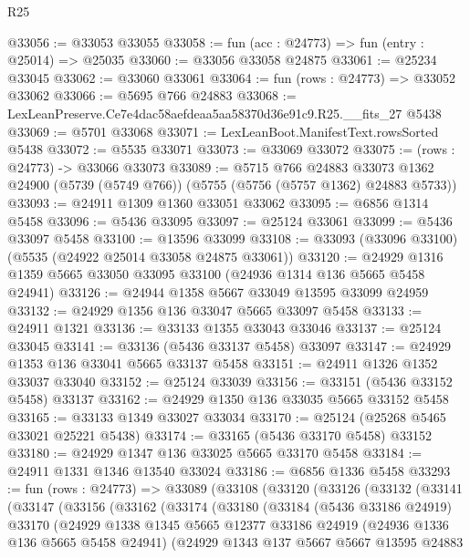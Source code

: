 \begin{lexlean}{R25}
\begin{coremodule}
@33056 := @33053 @33055
@33058 := fun (acc : @24773) => fun (entry : @25014) => @25035
@33060 := @33056 @33058 @24875
@33061 := @25234 @33045
@33062 := @33060 @33061
@33064 := fun (rows : @24773) => @33052 @33062
@33066 := @5695 @766 @24883
@33068 := LexLeanPreserve.Ce7e4dac58aefdeaa5aa58370d36e91c9.R25.__fits_27 @5438
@33069 := @5701 @33068
@33071 := LexLeanBoot.ManifestText.rowsSorted @5438
@33072 := @5535 @33071
@33073 := @33069 @33072
@33075 := (rows : @24773) -> @33066 @33073
@33089 := @5715
    @766
    @24883
    @33073
    @1362
    @24900
    (@5739 (@5749 @766))
    (@5755 (@5756 (@5757 @1362) @24883 @5733))
@33093 := @24911 @1309 @1360 @33051 @33062
@33095 := @6856 @1314 @5458
@33096 := @5436 @33095
@33097 := @25124 @33061
@33099 := @5436 @33097 @5458
@33100 := @13596 @33099
@33108 := @33093 (@33096 @33100) (@5535 (@24922 @25014 @33058 @24875 @33061))
@33120 := @24929 @1316 @1359 @5665 @33050 @33095 @33100 (@24936 @1314 @136 @5665 @5458 @24941)
@33126 := @24944 @1358 @5667 @33049 @13595 @33099 @24959
@33132 := @24929 @1356 @136 @33047 @5665 @33097 @5458
@33133 := @24911 @1321
@33136 := @33133 @1355 @33043 @33046
@33137 := @25124 @33045
@33141 := @33136 (@5436 @33137 @5458) @33097
@33147 := @24929 @1353 @136 @33041 @5665 @33137 @5458
@33151 := @24911 @1326 @1352 @33037 @33040
@33152 := @25124 @33039
@33156 := @33151 (@5436 @33152 @5458) @33137
@33162 := @24929 @1350 @136 @33035 @5665 @33152 @5458
@33165 := @33133 @1349 @33027 @33034
@33170 := @25124 (@25268 @5465 @33021 @25221 @5438)
@33174 := @33165 (@5436 @33170 @5458) @33152
@33180 := @24929 @1347 @136 @33025 @5665 @33170 @5458
@33184 := @24911 @1331 @1346 @13540 @33024
@33186 := @6856 @1336 @5458
@33293 := fun (rows : @24773) =>
  @33089
    (@33108
      (@33120
        (@33126
          (@33132
            (@33141
              (@33147
                (@33156
                  (@33162
                    (@33174
                      (@33180
                        (@33184
                          (@5436 @33186 @24919)
                          @33170
                          (@24929
                            @1338
                            @1345
                            @5665
                            @12377
                            @33186
                            @24919
                            (@24936 @1336 @136 @5665 @5458 @24941)
                            (@24929
                              @1343
                              @137
                              @5667
                              @5667
                              @13595
                              @24883

\end{coremodule}
\end{lexlean}
